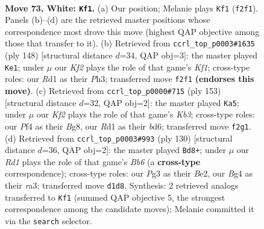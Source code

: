 \documentclass[11pt]{article}
\begin{document}
\clearpage

\begin{figure}[p]\centering
\begin{subfigure}{0.46\textwidth}\centering
\resizebox{\linewidth}{!}{%
\newchessgame
\chessboard[
  setfen={8/PbN5/5k2/n7/1p3PB1/6P1/5K1P/3R4 w - - 14 73},
  showmover=false,
  pgfstyle=straightmove, color=movearrow, markmove={f2-f1}
]}
\caption{}
\end{subfigure}\hfill
\begin{subfigure}{0.46\textwidth}\centering
\resizebox{\linewidth}{!}{%
\newchessgame
\chessboard[
  setfen={8/8/1b6/1P6/5pBp/3k3P/6P1/5K2 w - - 24 75},
  showmover=false,
  pgfstyle=straightmove, color=movearrow, markmove={f1-e1}
]}
\caption{}
\end{subfigure}
\\[4pt]
\begin{subfigure}{0.46\textwidth}\centering
\resizebox{\linewidth}{!}{%
\newchessgame
\chessboard[
  setfen={6b1/6N1/1kpB1K2/1p1p3B/3P4/6P1/8/r7 b - - 0 77},
  showmover=false,
  pgfstyle=straightmove, color=movearrow, markmove={b6-a5}
]}
\caption{}
\end{subfigure}\hfill
\begin{subfigure}{0.46\textwidth}\centering
\resizebox{\linewidth}{!}{%
\newchessgame
\chessboard[
  setfen={8/8/1B3k2/4p2P/4b1P1/r7/4B3/4K3 w - - 10 66},
  showmover=false,
  pgfstyle=straightmove, color=movearrow, markmove={b6-d8}
]}
\caption{}
\end{subfigure}
\caption{\textbf{Move 73, White: \texttt{Kf1}.} (a) Our position; Melanie plays \texttt{Kf1} (\texttt{f2f1}). Panels (b)--(d) are the retrieved master positions whose correspondence most drove this move (highest QAP objective among those that transfer to it). (b) Retrieved from \texttt{ccrl\_top\_p0003\#1635} (ply 148) [structural distance $d$=34, QAP obj=3]: the master played \texttt{Ke1}; under $\mu$ our \emph{Kf2} plays the role of that game's \emph{Kf1}; cross-type roles: our \emph{R}d1 as their \emph{P}h3; transferred move \texttt{f2f1} \textbf{(endorses this move)}. (c) Retrieved from \texttt{ccrl\_top\_p0000\#715} (ply 153) [structural distance $d$=32, QAP obj=2]: the master played \texttt{Ka5}; under $\mu$ our \emph{Kf2} plays the role of that game's \emph{Kb3}; cross-type roles: our \emph{P}f4 as their \emph{B}g8, our \emph{R}d1 as their \emph{b}d6; transferred move \texttt{f2g1}. (d) Retrieved from \texttt{ccrl\_top\_p0003\#993} (ply 130) [structural distance $d$=36, QAP obj=2]: the master played \texttt{Bd8+}; under $\mu$ our \emph{Rd1} plays the role of that game's \emph{Bb6} (a \textbf{cross-type} correspondence); cross-type roles: our \emph{P}g3 as their \emph{B}e2, our \emph{B}g4 as their \emph{r}a3; transferred move \texttt{d1d8}. Synthesis: 2 retrieved analogs transferred to \texttt{Kf1} (summed QAP objective 5, the strongest correspondence among the candidate moves); Melanie committed it via the \texttt{search} selector.}
\label{fig:thought-m144}
\end{figure}
\end{document}
